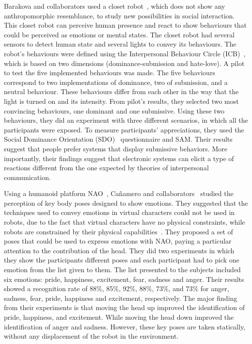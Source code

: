 Barakova and collaborators used a closet robot~\cite{Barakova2013}, which does not show any anthropomorphic resemblance, to study new possibilities in social interaction. This closet robot can perceive human presence and react to show behaviours that could be perceived as emotions or mental states. The closet robot had several sensors to detect human state and several lights to convey its behaviours. The robot's behaviours were defined using the Interpersonal Behaviour Circle (ICB)~\cite{Leary57}, which is based on two dimensions (dominance-submission and hate-love). A pilot to test the five implemented behaviours was made. The five behaviours correspond to two implementations of dominance, two of submission, and a neutral behaviour. These behaviours differ from each other in the way that the light is turned on and its intensity. From pilot's results, they selected two most convincing behaviours, one dominant and one submissive. Using these two behaviours, they did an experiment with three different scenarios, in which all the participants were exposed. To measure participants' appreciations, they used the Social Dominance Orientation (SDO)~\cite{ pratto1994social} questionnaire and SAM. Their results suggest that people prefer systems that display submissive behaviors. More importantly, their findings suggest that electronic systems can elicit a type of reactions different from the one expected by theories of interpersonal communication.

Using a humanoid platform NAO~\cite{NAO2013}, Ca\~namero and collaborators~\cite{Canamero2010,Beck2010} studied the perception of key body poses designed to show emotions. They suggested that the techniques used to convey emotions in virtual characters could not be used in robots, due to the fact that virtual characters have no physical constraints, while robots are constrained by their physical capabilities~\cite{Saerbeck2007, Canamero2010}. They proposed a set of poses that could be used to express emotions with NAO, paying a particular attention to the contribution of the head. They did two experiments in which they show the participants different poses and each participant had to pick one emotion from the list given to them. The list presented to the subjects included six emotions: pride, happiness, excitement, fear, sadness and anger. Their results showed a recognition rate of 88\%, 85\%, 92\%, 88\%, 73\%, and 73\% for anger, sadness, fear, pride, happiness and excitement, respectively. The major finding from their experiments is that moving the head up improved the identification of pride, happiness, and excitement. While moving the head down improved the identification of anger and sadness. However, these key poses are taken statically, without any displacement of the robot in the environment.

